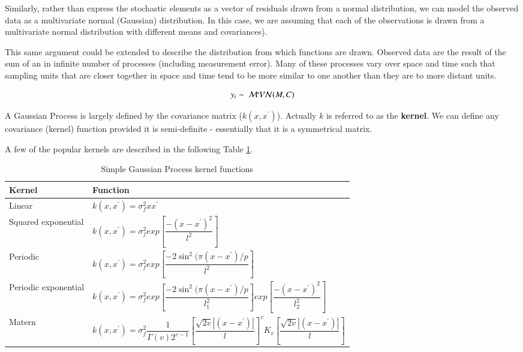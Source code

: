 Similarly, rather than express the stochastic elements as a vector of residuals drawn from a normal distribution, we can
model the observed data as a multivariate normal (Gaussian) distribution.  In this case, we are assuming that each of the
observations is drawn from a multivariate normal distribution with different means and covariances).

This same argument could be extended to describe the distribution from which functions are drawn.  
Observed data are the result of the sum of an in infinite number of processes (including measurement error).  Many of these processes
vary over space and time such that sampling units that are closer together in space and time tend to be more similar to one
another than they are to more distant units.


$$
y_i \sim~\mathcal{MVN}(M, C)\hspace{1cm}\\
$$

A Gaussian Process is largely defined by the covariance matrix ($k(x,x^\prime)$).  Actually $k$ is referred to as the \textbf{kernel}.
We can define any covariance (kernel) function provided it is semi-definite - essentially that it is a symmetrical matrix.

A few of the popular kernels are described in the following Table \ref{ref:GP_functions}.

\begin{table}[!htbp]
  \caption{Simple Gaussian Process kernel functions}\label{ref:GP_functions}
  \begin{tabular}{ll}
    \toprule
    Kernel & Function\\
    \midrule
    Linear &              $k(x,x^\prime) = \sigma^2_f xx^\prime$\\[1em]
    Squared exponential & $k(x,x^\prime) = \sigma^2_f exp\left[\dfrac{-(x-x^\prime)^2}{l^2}\right]$\\[1em]
    Periodic   &          $k(x,x^\prime) = \sigma^2_f exp\left[\dfrac{-2\sin^2(\pi(x-x^\prime)/p}{l^2}\right]$\\[1em]
    Periodic exponential & $k(x,x^\prime) = \sigma^2_f exp\left[\dfrac{-2\sin^2(\pi(x-x^\prime)/p}{l_1^2}\right]exp\left[\dfrac{-(x-x^\prime)^2}{l_2^2}\right]$\\[1em]
    Matern     &          $k(x,x^\prime) = \sigma^2_f \dfrac{1}{\Gamma(v)2^{v-1}}\left[\dfrac{\sqrt{2v} |(x-x^\prime)|}{l}\right]^v K_v\left[\dfrac{\sqrt{2v} |(x-x^\prime)|}{l}\right]$\\[1em]
    \bottomrule
  \end{tabular}
\end{table}

